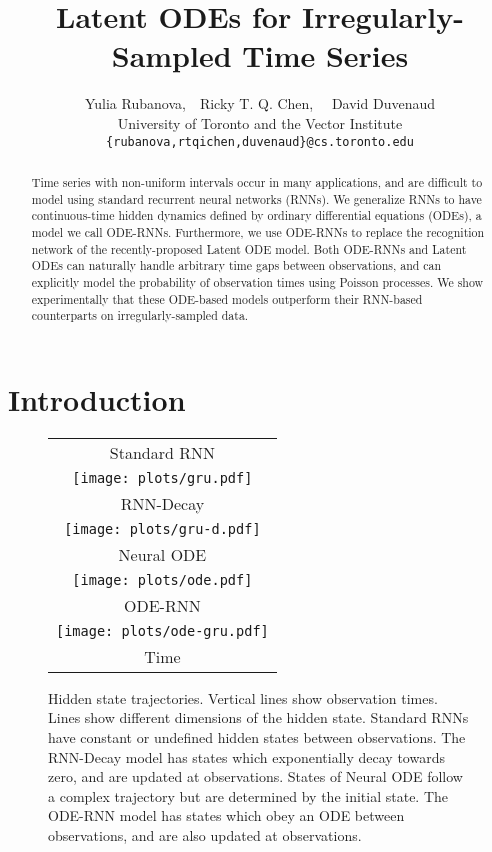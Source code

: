 \documentclass{article}
\title{Latent ODEs for Irregularly-Sampled Time Series}
\author{Yulia Rubanova,\ \  Ricky T. Q. Chen, \ \ David Duvenaud \\
University of Toronto and the Vector Institute \\
\texttt{\{rubanova,rtqichen,duvenaud\}@cs.toronto.edu}}
\begin{document}
\maketitle
\begin{abstract}
Time series with non-uniform intervals occur in many applications, and are difficult to model using standard recurrent neural networks (RNNs).
We generalize RNNs to have continuous-time hidden dynamics defined by ordinary differential equations (ODEs), a model we call ODE-RNNs.
Furthermore, we use ODE-RNNs to replace the recognition network of the recently-proposed Latent ODE model.
Both ODE-RNNs and Latent ODEs can naturally handle arbitrary time gaps between observations, and can explicitly model the probability of observation times using Poisson processes.
We show experimentally that these ODE-based models outperform their RNN-based counterparts on irregularly-sampled data.
\end{abstract}

\section{Introduction}

\begin{wrapfigure}[29]{r}{0.41\textwidth}
\vspace{-6mm}\hspace{-2mm}\begin{tabular}{c}
Standard RNN \vspace{-0.5mm} \\ \texttt{[image: plots/gru.pdf]}\\
RNN-Decay    \vspace{-0.4mm} \\ \texttt{[image: plots/gru-d.pdf]} \\
Neural ODE          \vspace{-0.5mm} \\ \texttt{[image: plots/ode.pdf]} \\
ODE-RNN      \vspace{-0.5mm} \\ \texttt{[image: plots/ode-gru.pdf]}\\ 
{\small Time}
\end{tabular}
\caption{Hidden state trajectories.
Vertical lines show observation times. Lines show different dimensions of the hidden state.
Standard RNNs have constant or undefined hidden states between observations. 
The RNN-Decay model has states which exponentially decay towards zero, and are updated at observations.
States of Neural ODE follow a complex trajectory but are determined by the initial state.
The ODE-RNN model has states which obey an ODE between observations, and are also updated at observations.
}
\label{fig:fig1}
\end{wrapfigure}
\end{document}
